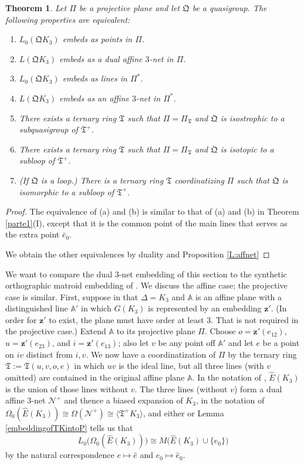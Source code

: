 \documentclass[reqno,12pt]{amsart}
\newcommand \comment[1]{}				%
\newtheorem{thm}{Theorem}[section]
\theoremstyle{remark}
\numberwithin{equation}{section}
\numberwithin{figure}{section}
\newcommand \bgr[1]{\langle#1\rangle}
\newcommand \bz{\mathbf{z}}	%
\newcommand \cN{\mathcal{N}}
\newcommand \bbA{\mathbb{A}}
\newcommand \fQ{\mathfrak Q}
\newcommand \fT{\mathfrak T}
\newcommand \he{{\hat e}}
\newcommand \hE{{\hat E}}
\newcommand\Qez{e_0}
\newcommand\Tez{\bar e_0}
\newcommand\PP{\Pi}	%
\newcommand\orthoaff{\cite[Section 3.1.2\comment{orthoaff}]{BG6} }	%
\newcommand\orthopar{\cite[Section 3.1\comment{orthopar}]{BG6} }	%
\begin{document}
\begin{thm}\label{bmain} 
Let $\PP$ be a projective plane and let $\fQ$ be a quasigroup.  
The following properties are equivalent:
%
\begin{enumerate}[{\rm(a)}]
\item $L_0(\fQ K_3)$ embeds as points in $\PP$.
\item $L(\fQ K_3)$ embeds as a dual affine $3$-net in $\PP$.
\item $L_0(\fQ K_3)$ embeds as lines in $\PP^*$.
\item $L(\fQ K_3)$ embeds as an affine $3$-net in $\PP^*$.
\item There exists a ternary ring $\fT$ such that $\PP = \PP_\fT$ and $\fQ$ is isostrophic to a subquasigroup of $\fT^+$.
\item There exists a ternary ring $\fT$ such that $\PP = \PP_\fT$ and $\fQ$ is isotopic to a subloop of $\fT^+$.
\item (If $\fQ$ is a loop.)  There is a ternary ring $\fT$ coordinatizing $\PP$ such that $\fQ$ is isomorphic to a subloop of $\fT^+$.
\end{enumerate}
\end{thm}

\begin{proof}
The equivalence of (a) and (b) is similar to that of (a) and (b) in Theorem \ref{parte1}(I), except that it is the common point of the main lines that serves as the extra point $\Tez$.

We obtain the other equivalences by duality and Proposition \ref{L:affnet}
\end{proof}


We want to compare the dual $3$-net embedding of this section to the synthetic orthographic matroid embedding of \orthopar.  We discuss the affine case; the projective case is similar.  
First, suppose in \orthoaff that $\Delta = K_3$ and $\bbA$ is an affine plane with a distinguished line $\bbA'$ in which $G(K_3)$ is represented by an embedding $\bz'$.  (In order for $\bz'$ to exist, the plane must have order at least 3.  That is not required in the projective case.)  Extend $\bbA$ to its projective plane $\PP$.  Choose $o=\bz'(e_{12})$, $u=\bz'(e_{23})$, and $i=\bz'(e_{13})$; also let $v$ be any point off $\bbA'$ and let $e$ be a point on $iv$ distinct from $i, v$.  We now have a coordinatization of $\PP$ by the ternary ring $\fT:=\fT(u,v,o,e)$ in which $uv$ is the ideal line, but all three lines (with $v$ omitted) are contained in the original affine plane $\bbA$.  In the notation of \orthopar, $\hE(K_3)$ is the union of those lines without $v$.  The three lines (without $v$) form a dual affine $3$-net $\cN^+$ and thence a biased expansion of $K_3$, in the notation of \orthopar $\Omega_0(\hE(K_3)) \cong \Omega(\cN^+) \cong \bgr{\fT^+K_3}$, and either \cite[Theorem 3.1\comment{TD:orthorep}]{BG6} or Lemma \ref{embeddingofTKintoP} tells us that 
$$
L_0\big(\Omega_0(\hE(K_3))\big) \cong M\big(\hE(K_3) \cup \{\he_0\}\big)
$$
by the natural correspondence $e\mapsto \he$ and $\Qez \mapsto \he_0$.
\end{document}
